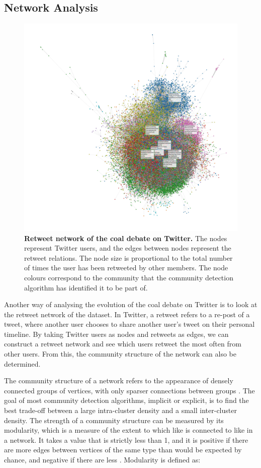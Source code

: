 \documentclass[12pt,onecolumn,twoside]{layout}
\begin{document}
\subsection*{Network Analysis}
\begin{figure}
	\begin{center}
		\includegraphics[width=0.8\linewidth]{figures/rt_network_ht2}
	\end{center}
	\caption{\textbf{Retweet network of the coal debate on Twitter.} The nodes represent Twitter users, and the edges between nodes represent the retweet relations. The node size is proportional to the total number of times the user has been retweeted by other members. The node colours correspond to the community that the community detection algorithm has identified it to be part of.}
	\label{fig:rt_network}
\end{figure}


Another way of analysing the evolution of the coal debate on Twitter is to look at the retweet network of the dataset. In Twitter, a retweet refers to a re-post of a tweet, where another user chooses to share another user's tweet on their personal timeline. By taking Twitter users as nodes and retweets as edges, we can construct a retweet network and see which users retweet the most often from other users. From this, the community structure of the network can also be determined.

The community structure of a network refers to the appearance of densely connected groups of vertices, with only sparser connections between groups \citep{Newman8577}. The goal of most community detection algorithms, implicit or explicit, is to find the best trade-off between a large intra-cluster density and a small inter-cluster density. The strength of a community structure can be measured by its modularity, which is a measure of the extent to which like is connected to like in a network. It takes a value that is strictly less than 1, and it is positive if there are more edges between vertices of the same type than would be expected by chance, and negative if there are less \citep{Newman8577}. Modularity is defined as:
\end{document}
